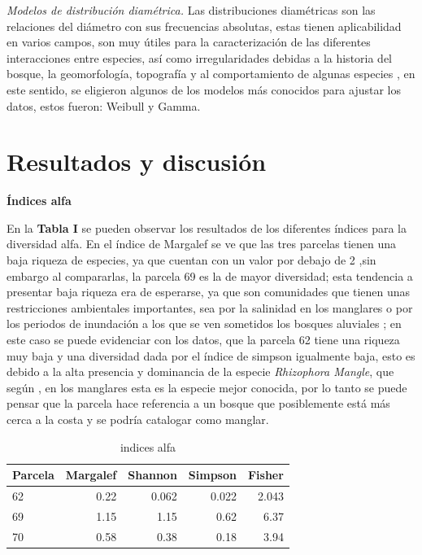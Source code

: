 \documentclass[conference,final,12pt,]{IEEEtran}
\begin{document}
\emph{Modelos de distribución diamétrica.} Las distribuciones
diamétricas son las relaciones del diámetro con sus frecuencias absolutas, 
estas tienen aplicabilidad en varios campos, son muy útiles para la caracterización de  las diferentes interacciones entre especies, así como irregularidades debidas a la historia del bosque, la geomorfología, topografía y al comportamiento de algunas especies \citep{AE}, en este sentido, se eligieron algunos de los
modelos más conocidos para ajustar los datos, estos fueron: Weibull y
Gamma.

\hypertarget{resultados-y-discusiuxf3n}{%
\section{Resultados y discusión}\label{resultados-y-discusiuxf3n}}

\textbf{Índices alfa} 

En la \textbf{Tabla I} se pueden observar los
resultados de los diferentes índices para la diversidad alfa. En el
índice de Margalef se ve que las tres parcelas tienen una
baja riqueza de especies, ya que cuentan con un valor por debajo de 2
\citep{B},sin embargo al compararlas, la parcela 69 es la de mayor
diversidad; esta tendencia a presentar baja riqueza era de
esperarse, ya que son comunidades que tienen unas restricciones
ambientales importantes, sea por la salinidad en los manglares
\citep{AD} o por los periodos de inundación a los que se ven sometidos
los bosques aluviales \citep{Z}; en este caso se puede evidenciar con los
datos, que la parcela 62 tiene una riqueza muy baja
y una diversidad dada por el índice de simpson igualmente baja, esto es
debido a la alta presencia y dominancia de la especie \emph{Rhizophora
Mangle}, que según \citep{Z}, en los manglares esta es la especie mejor
conocida, por lo tanto se puede pensar que la parcela hace referencia
a un bosque que posiblemente está más cerca a la costa y se podría
catalogar como manglar.

\begin{table}[htb]

\caption{\label{tab:unnamed-chunk-2}indices alfa}
\centering
\begin{tabular}[t]{l|r|r|r|r}
\hline
Parcela & Margalef & Shannon & Simpson & Fisher\\
\hline
62 & 0.22 & 0.062 & 0.022 & 2.043\\
\hline
69 & 1.15 & 1.15 & 0.62 & 6.37\\
\hline
70 & 0.58 & 0.38 & 0.18 & 3.94\\
\hline
\end{tabular}
\end{table}
\end{document}
